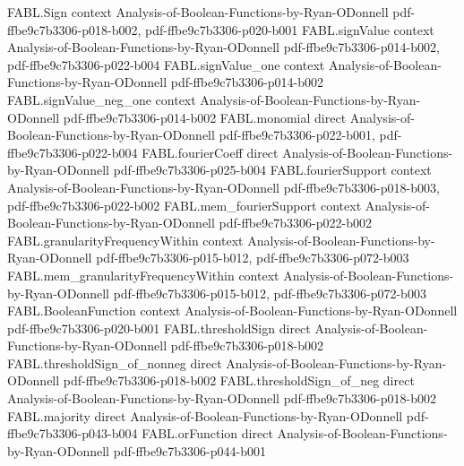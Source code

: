 \begin{theorem}
\label{FABL.orFunction_symmetric}
\leanok
{}
\proofstep
  {FABL.Sign}
  {context}
  {Analysis-of-Boolean-Functions-by-Ryan-ODonnell}
  {pdf-ffbe9c7b3306-p018-b002,
    pdf-ffbe9c7b3306-p020-b001}
\proofstep
  {FABL.signValue}
  {context}
  {Analysis-of-Boolean-Functions-by-Ryan-ODonnell}
  {pdf-ffbe9c7b3306-p014-b002,
    pdf-ffbe9c7b3306-p022-b004}
\proofstep
  {FABL.signValue_one}
  {context}
  {Analysis-of-Boolean-Functions-by-Ryan-ODonnell}
  {pdf-ffbe9c7b3306-p014-b002}
\proofstep
  {FABL.signValue_neg_one}
  {context}
  {Analysis-of-Boolean-Functions-by-Ryan-ODonnell}
  {pdf-ffbe9c7b3306-p014-b002}
\proofstep
  {FABL.monomial}
  {direct}
  {Analysis-of-Boolean-Functions-by-Ryan-ODonnell}
  {pdf-ffbe9c7b3306-p022-b001,
    pdf-ffbe9c7b3306-p022-b004}
\proofstep
  {FABL.fourierCoeff}
  {direct}
  {Analysis-of-Boolean-Functions-by-Ryan-ODonnell}
  {pdf-ffbe9c7b3306-p025-b004}
\proofstep
  {FABL.fourierSupport}
  {context}
  {Analysis-of-Boolean-Functions-by-Ryan-ODonnell}
  {pdf-ffbe9c7b3306-p018-b003,
    pdf-ffbe9c7b3306-p022-b002}
\proofstep
  {FABL.mem_fourierSupport}
  {context}
  {Analysis-of-Boolean-Functions-by-Ryan-ODonnell}
  {pdf-ffbe9c7b3306-p022-b002}
\proofstep
  {FABL.granularityFrequencyWithin}
  {context}
  {Analysis-of-Boolean-Functions-by-Ryan-ODonnell}
  {pdf-ffbe9c7b3306-p015-b012,
    pdf-ffbe9c7b3306-p072-b003}
\proofstep
  {FABL.mem_granularityFrequencyWithin}
  {context}
  {Analysis-of-Boolean-Functions-by-Ryan-ODonnell}
  {pdf-ffbe9c7b3306-p015-b012,
    pdf-ffbe9c7b3306-p072-b003}
\proofstep
  {FABL.BooleanFunction}
  {context}
  {Analysis-of-Boolean-Functions-by-Ryan-ODonnell}
  {pdf-ffbe9c7b3306-p020-b001}
\proofstep
  {FABL.thresholdSign}
  {direct}
  {Analysis-of-Boolean-Functions-by-Ryan-ODonnell}
  {pdf-ffbe9c7b3306-p018-b002}
\proofstep
  {FABL.thresholdSign_of_nonneg}
  {direct}
  {Analysis-of-Boolean-Functions-by-Ryan-ODonnell}
  {pdf-ffbe9c7b3306-p018-b002}
\proofstep
  {FABL.thresholdSign_of_neg}
  {direct}
  {Analysis-of-Boolean-Functions-by-Ryan-ODonnell}
  {pdf-ffbe9c7b3306-p018-b002}
\proofstep
  {FABL.majority}
  {direct}
  {Analysis-of-Boolean-Functions-by-Ryan-ODonnell}
  {pdf-ffbe9c7b3306-p043-b004}
\proofstep
  {FABL.orFunction}
  {direct}
  {Analysis-of-Boolean-Functions-by-Ryan-ODonnell}
  {pdf-ffbe9c7b3306-p044-b001}

\end{theorem}
